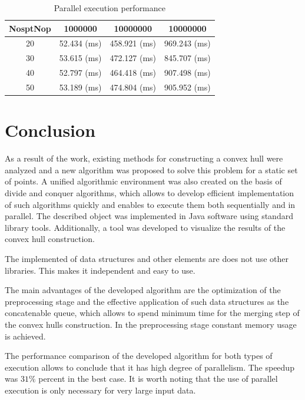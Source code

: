 \documentclass[conference]{IEEEtran}
\theoremstyle{plane}
\begin{document}
\begin{table}[htbp]
	\caption{Parallel execution performance}
	\begin{center}
		\begin{tabular}{|c|c|c|c|}
			\hline
			\textbf{NosptNop} & 1000000 & 10000000 & 10000000 \\
			\hline
			20 &52.434 (ms)&458.921 (ms)&969.243 (ms)\\
			
			\hline
			30 &53.615 (ms)&472.127 (ms)&845.707 (ms)\\
			
			\hline
			40 &52.797 (ms)&464.418 (ms)&907.498 (ms)\\
			
			\hline
			50 &53.189 (ms)&474.804 (ms)&905.952 (ms)\\	
			\hline
		\end{tabular} 
	\end{center}
\end{table}

\section*{Conclusion}

As a result of the work, existing methods for constructing a convex hull were analyzed and a new algorithm was proposed to solve this problem for a static set of points. A unified algorithmic environment was also created on the basis of divide and conquer algorithms, which allows to develop efficient implementation of such algorithms quickly and enables to execute them both sequentially and in parallel. The described object was implemented in Java software using standard library tools. Additionally, a tool was developed to visualize the results of the convex hull construction.

The implemented of data structures and other elements are does not use other libraries. This makes it independent and easy to use.

The main advantages of the developed algorithm are the optimization of the preprocessing stage and the effective application of such data structures as the concatenable queue, which allows to spend minimum time for the merging step of the convex hulls construction. In the preprocessing stage constant memory usage is achieved.

The performance comparison of the developed algorithm for both types of execution allows to conclude that it has high degree of parallelism. The speedup was $31\%$ percent in the best case. It is worth noting that the use of parallel execution is only necessary for very large input data.
\end{document}
